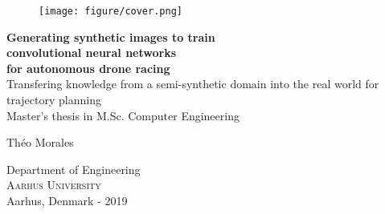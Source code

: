 
\begin{titlepage}
			
\addtolength{\voffset}{2cm}

\begin{figure}[H]
\centering
\vspace{2cm}	%
\texttt{[image: figure/cover.png]}
\end{figure}

\mbox{}
\vfill
\renewcommand{\familydefault}{\sfdefault} \normalfont %
\textbf{{\Huge 	Generating synthetic images to train \\[0.2cm] 
		convolutional neural networks \\[0.3cm]
		for autonomous drone racing }} 	\\[0.5cm]
{\Large Transfering knowledge from a semi-synthetic domain into the real world
for trajectory planning}\\[0.5cm]
Master's thesis in M.Sc. Computer Engineering \setlength{\parskip}{1cm}

{\Large Théo Morales \setlength{\parskip}{2.9cm}}

Department of Engineering \\
\textsc{Aarhus University} \\
Aarhus, Denmark - 2019

\renewcommand{\familydefault}{\rmdefault} \normalfont %
\end{titlepage}




